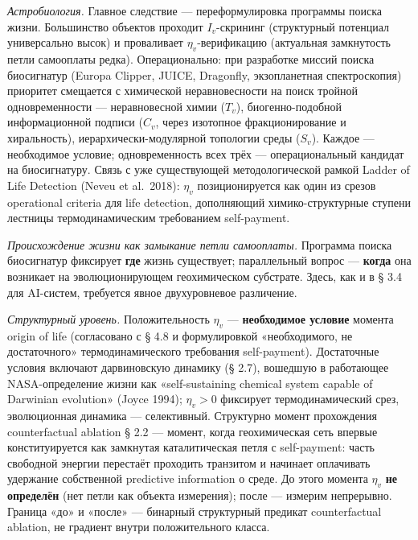 \documentclass[pdflatex,sn-mathphys-ay]{sn-jnl}
\begin{document}
\emph{Астробиология.} Главное следствие --- переформулировка программы поиска жизни. Большинство объектов проходит \(I_v\)-скрининг (структурный потенциал универсально высок) и проваливает \(\eta_v\)-верификацию (актуальная замкнутость петли самооплаты редка). Операционально: при разработке миссий поиска биосигнатур (Europa Clipper, JUICE, Dragonfly, экзопланетная спектроскопия) приоритет смещается с химической неравновесности на поиск тройной одновременности --- неравновесной химии (\(T_v\)), биогенно-подобной информационной подписи (\(C_v\), через изотопное фракционирование и хиральность), иерархически-модулярной топологии среды (\(S_v\)). Каждое --- необходимое условие; одновременность всех трёх --- операциональный кандидат на биосигнатуру. Связь с уже существующей методологической рамкой Ladder of Life Detection (Neveu et al.~2018): \(\eta_v\) позиционируется как один из срезов operational criteria для life detection, дополняющий химико-структурные ступени лестницы термодинамическим требованием self-payment.

\emph{Происхождение жизни как замыкание петли самооплаты.} Программа поиска биосигнатур фиксирует \textbf{где} жизнь существует; параллельный вопрос --- \textbf{когда} она возникает на эволюционирующем геохимическом субстрате. Здесь, как и в § 3.4 для AI-систем, требуется явное двухуровневое различение.

\emph{Структурный уровень.} Положительность \(\eta_v\) --- \textbf{необходимое условие} момента origin of life (согласовано с § 4.8 и формулировкой «необходимого, не достаточного» термодинамического требования self-payment). Достаточные условия включают дарвиновскую динамику (§ 2.7), вошедшую в работающее NASA-определение жизни как «self-sustaining chemical system capable of Darwinian evolution» (Joyce 1994); \(\eta_v > 0\) фиксирует термодинамический срез, эволюционная динамика --- селективный. Структурно момент прохождения counterfactual ablation § 2.2 --- момент, когда геохимическая сеть впервые конституируется как замкнутая каталитическая петля с self-payment: часть свободной энергии перестаёт проходить транзитом и начинает оплачивать удержание собственной predictive information о среде. До этого момента \(\eta_v\) \textbf{не определён} (нет петли как объекта измерения); после --- измерим непрерывно. Граница «до» и «после» --- бинарный структурный предикат counterfactual ablation, не градиент внутри положительного класса.
\end{document}

